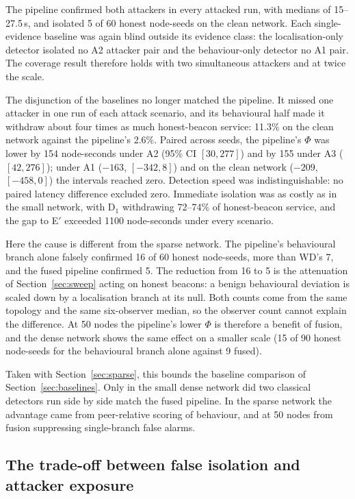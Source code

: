 The pipeline confirmed both attackers in every attacked run, with medians of
15--27.5\,s, and isolated 5 of 60 honest node-seeds on the clean network.
Each single-evidence baseline was again blind outside its evidence class:
the localisation-only detector isolated no A2 attacker pair and the
behaviour-only detector no A1 pair. The coverage result therefore holds with
two simultaneous attackers and at twice the scale.

The disjunction of the baselines no longer matched the pipeline. It missed
one attacker in one run of each attack scenario, and its behavioural half
made it withdraw about four times as much honest-beacon service: 11.3\% on
the clean network against the pipeline's 2.6\%. Paired across
seeds, the pipeline's $\Phi$ was lower by 154 node-seconds under A2 (95\% CI
$[30, 277]$) and by 155 under A3 ($[42, 276]$); under A1 ($-163$,
$[-342, 8]$) and on the clean network ($-209$, $[-458, 0]$) the intervals
reached zero. Detection speed was indistinguishable: no paired latency
difference excluded zero. Immediate isolation was as costly as in the small
network, with D$_1$ withdrawing 72--74\% of honest-beacon service, and the
gap to E$'$ exceeded 1100 node-seconds under every scenario.

Here the cause is different from the sparse network. The pipeline's
behavioural branch alone falsely confirmed 16 of 60 honest node-seeds, more
than WD's 7, and the fused pipeline confirmed 5. The reduction from 16 to 5
is the attenuation of Section~\ref{sec:sweep} acting on honest beacons: a
benign behavioural deviation is scaled down by a localisation branch at its
null. Both counts come from the same topology and the same six-observer
median, so the observer count cannot explain the difference. At 50 nodes the
pipeline's lower $\Phi$ is therefore a benefit of fusion, and the dense
network shows the same effect on a smaller scale (15 of 90 honest node-seeds
for the behavioural branch alone against 9 fused).

Taken with Section~\ref{sec:sparse}, this bounds the baseline comparison of
Section~\ref{sec:baselines}. Only in the small dense network did two
classical detectors run side by side match the fused pipeline. In the sparse
network the advantage came from peer-relative scoring of behaviour, and at 50
nodes from fusion suppressing single-branch false alarms.

\subsection{The trade-off between false isolation and attacker exposure}
\label{sec:frontier}

